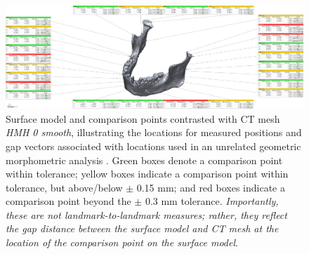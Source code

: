 \documentclass[review]{elsarticle}
\begin{document}
\begin{figure}[ht]\centering
\includegraphics[width=\linewidth]{Fig5}
\caption{Surface model and comparison points contrasted with CT mesh \textit{HMH 0 smooth}, illustrating the locations for measured positions and gap vectors associated with locations used in an unrelated geometric morphometric analysis \cite[Supplementary Information]{RN11477}. Green boxes denote a comparison point within tolerance; yellow boxes indicate a comparison point within tolerance, but above/below $\pm$ 0.15 mm; and red boxes indicate a comparison point beyond the $\pm$ 0.3 mm tolerance. \textit{Importantly, these are not landmark-to-landmark measures; rather, they reflect the gap distance between the surface model and CT mesh at the location of the comparison point on the surface model}.}
\label{fig:Fig5}
\end{figure}
\end{document}
